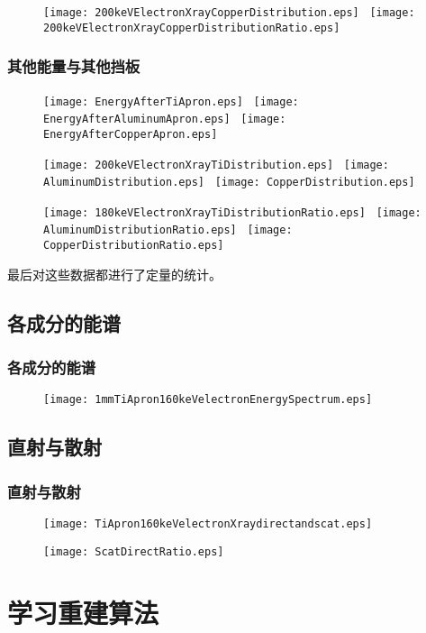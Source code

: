 \documentclass{beamer}
\begin{document}
\begin{CJK*}{UTF8}{gkai}
\begin{frame}
\begin{figure}[ht]
      \texttt{[image: 200keVElectronXrayCopperDistribution.eps]}~
      \texttt{[image: 200keVElectronXrayCopperDistributionRatio.eps]}
    \end{figure}
  \end{frame}
  \begin{frame}\frametitle{其他能量与其他挡板}
    \vskip -0.8cm
    \begin{figure}[ht]
      \texttt{[image: EnergyAfterTiApron.eps]}~
      \texttt{[image: EnergyAfterAluminumApron.eps]}~
      \texttt{[image: EnergyAfterCopperApron.eps]}

      \texttt{[image: 200keVElectronXrayTiDistribution.eps]}~
      \texttt{[image: AluminumDistribution.eps]}~
      \texttt{[image: CopperDistribution.eps]}
      
      \texttt{[image: 180keVElectronXrayTiDistributionRatio.eps]}~
      \texttt{[image: AluminumDistributionRatio.eps]}~
      \texttt{[image: CopperDistributionRatio.eps]}
    \end{figure}
    \vskip -0.3cm
    \liuhao
    最后对这些数据都进行了定量的统计。
  \end{frame}
  \subsection{各成分的能谱}
  \begin{frame}\frametitle{各成分的能谱}
    \begin{figure}[ht]
      \texttt{[image: 1mmTiApron160keVelectronEnergySpectrum.eps]}
    \end{figure}
  \end{frame}
  \subsection{直射与散射}
  \begin{frame}\frametitle{直射与散射}
    \begin{figure}[ht]
      \texttt{[image: TiApron160keVelectronXraydirectandscat.eps]}

      \texttt{[image: ScatDirectRatio.eps]}
    \end{figure}
  \end{frame}
  \section{学习重建算法}
  \ThankYouPage
\end{CJK*}
\end{document}

